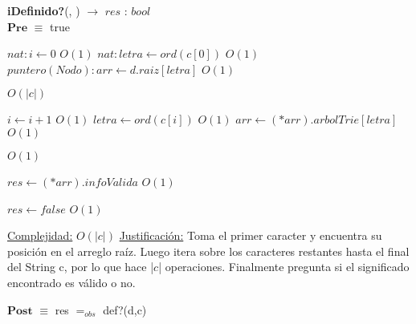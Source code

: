 \begin{algorithm}[H]{\textbf{iDefinido?}(, ) $\to$ $res$ : $bool$}
	{\\ $\textbf{Pre}$ $\equiv$ true}
	\begin{algorithmic}

		\State $nat: i \gets 0$ \Comment $O(1)$
		\State $nat: letra \gets ord(c[0])$ \Comment $O(1)$
		\State $puntero(Nodo): arr \gets d.raiz[letra]$ \Comment $O(1)$

		 \Comment $O(|c|)$

			\State $i \gets i + 1$ \Comment $O(1)$
			\State $letra \gets ord(c[i])$ \Comment $O(1)$
			\State $arr \gets (*arr).arbolTrie[letra]$ \Comment $O(1)$

		\EndWhile

		 \Comment $O(1)$
		
			\State $res \gets (*arr).infoValida$ \Comment $O(1)$

		\Else

			\State $res \gets false$ \Comment $O(1)$

		\EndIf

		\medskip
		\Statex \underline{Complejidad:} $O(|c|)$
		\Statex \underline{Justificación:} Toma el primer caracter y encuentra su posición en el arreglo raíz. Luego itera sobre los caracteres restantes hasta el final del String c, por lo que hace |$c$| operaciones. Finalmente pregunta si el significado encontrado es válido o no.
    \end{algorithmic}
    {$\textbf{Post}$ $\equiv$ res $=_{obs}$ def?(d,c)}
\end{algorithm}


